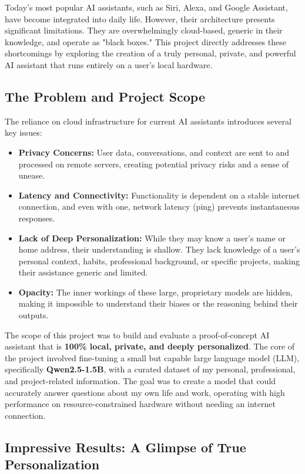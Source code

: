 \documentclass[conference]{IEEEtran}
\begin{document}
Today's most popular AI assistants, such as Siri, Alexa, and Google Assistant, have become integrated into daily life. However, their architecture presents significant limitations. They are overwhelmingly cloud-based, generic in their knowledge, and operate as "black boxes." This project directly addresses these shortcomings by exploring the creation of a truly personal, private, and powerful AI assistant that runs entirely on a user's local hardware.

\subsection{The Problem and Project Scope}

The reliance on cloud infrastructure for current AI assistants introduces several key issues:
\begin{itemize}
    \item \textbf{Privacy Concerns:} User data, conversations, and context are sent to and processed on remote servers, creating potential privacy risks and a sense of unease.
    \item \textbf{Latency and Connectivity:} Functionality is dependent on a stable internet connection, and even with one, network latency (ping) prevents instantaneous responses.
    \item \textbf{Lack of Deep Personalization:} While they may know a user's name or home address, their understanding is shallow. They lack knowledge of a user's personal context, habits, professional background, or specific projects, making their assistance generic and limited.
    \item \textbf{Opacity:} The inner workings of these large, proprietary models are hidden, making it impossible to understand their biases or the reasoning behind their outputs.
\end{itemize}

The scope of this project was to build and evaluate a proof-of-concept AI assistant that is \textbf{100\% local, private, and deeply personalized}. The core of the project involved fine-tuning a small but capable large language model (LLM), specifically \textbf{Qwen2.5-1.5B}, with a curated dataset of my personal, professional, and project-related information. The goal was to create a model that could accurately answer questions about my own life and work, operating with high performance on resource-constrained hardware without needing an internet connection.

\subsection{Impressive Results: A Glimpse of True Personalization}
\end{document}

